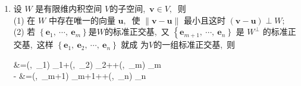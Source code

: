 \begin{enumerate}
$$\begin{array}{ll}
			\boldsymbol{S} & \boldsymbol{O} \\
			\boldsymbol{O} & \boldsymbol{O}
		\end{array}\right)$$
		其中
		$$\boldsymbol{S}=\left(\begin{array}{llll}
			\sigma_{1} & & & \\
			& \sigma_{2} & & \\
			& & \ddots & \\
			& & & \sigma_{r}
		\end{array}\right)$$
		是一个$  r  $阶对角阵,\ $  \sigma_{1} \geqslant \sigma_{2} \geqslant \cdots \geqslant \sigma_{r}>0 $ 是 $ \varphi $ 的非 零奇异值.
		$\boldsymbol{P}^{\prime} \boldsymbol{A} \boldsymbol{Q}=\left(\begin{array}{ll}
			\boldsymbol{S} & \boldsymbol{O} \\
			\boldsymbol{O} & \boldsymbol{O}
		\end{array}\right)  $称为矩阵  $\boldsymbol{A}  $的正交相抵标准型,\  而  $\boldsymbol{A}=\boldsymbol{P}\left(\begin{array}{ll}
			\boldsymbol{S} & \boldsymbol{O} \\
			\boldsymbol{O} & \boldsymbol{O}
		\end{array}\right)$$ \boldsymbol{Q}^{\prime}  $称为矩阵 $ \boldsymbol{A} $ 的奇异值分解. 通过奇 异值分解很容易得到极分解.
		\item 设  $W $ 是有限维内积空间 $ V  $的子空间,\   $\boldsymbol{v}\in V ,\ $ 则\\
		(1) 在  $W$  中存在唯一的向量  $\boldsymbol{u} ,\ $ 使  $\|\boldsymbol{v}-\boldsymbol{u}\| $ 最小且这时  $(\boldsymbol{v}-\boldsymbol{u}) \perp W ;$\\
		(2) 若 $ \left\{\boldsymbol{e}_{1},\  \cdots,\  \boldsymbol{e}_{m}\right\}  $是$  W  $的标准正交基,\  又  $\left\{\boldsymbol{e}_{m+1},\  \cdots\right. ,\   \left.\boldsymbol{e}_{n}\right\} $ 是 $ W^{\perp} $ 的标准正交基,\  这样  $\left\{\boldsymbol{e}_{1},\  \boldsymbol{e}_{2},\  \cdots,\  \boldsymbol{e}_{n}\right\} $ 就成 为$  V  $的一组标准正交基,\  则
		$$\begin{aligned}
			 &=\left(,\  _{1}\right) _{1}+\left(,\  _{2}\right) _{2}+\cdots+\left(,\  _{m}\right) _{m} \\
			- &=\left(,\  _{m+1}\right) _{m+1}+\cdots+\left(,\  _{n}\right) _{n} \\

\end{aligned}
\end{enumerate}
